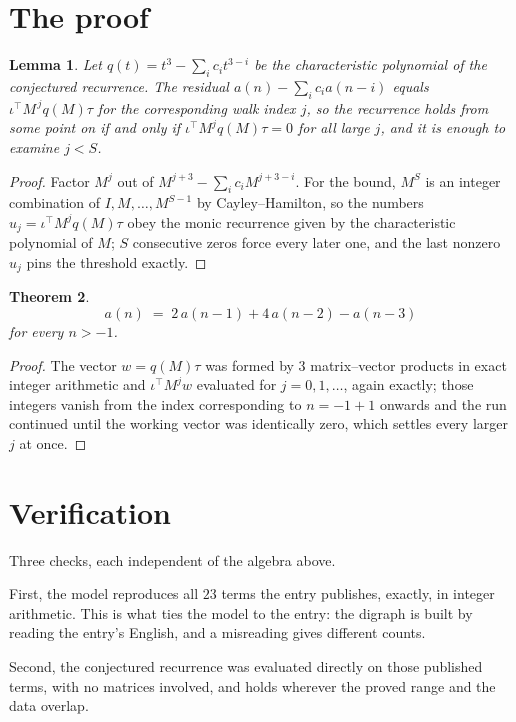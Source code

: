 \documentclass[11pt,a4paper]{article}
\theoremstyle{plain}
\newtheorem{theorem}{Theorem}
\newtheorem{lemma}[theorem]{Lemma}
\theoremstyle{definition}
\begin{document}
\section{The proof}

\begin{lemma}\label{lem:crit}
Let $q(t)=t^{3}-\sum_i c_it^{3-i}$ be the characteristic polynomial of the
conjectured recurrence. The residual $a(n)-\sum_ic_ia(n-i)$ equals
$\iota^{\!\top}M^{\,j}q(M)\tau$ for the corresponding walk index $j$, so the recurrence
holds from some point on if and only if $\iota^{\!\top}M^{j}q(M)\tau=0$ for all large $j$,
and it is enough to examine $j<S$.
\end{lemma}

\begin{proof}
Factor $M^{j}$ out of $M^{j+3}-\sum_ic_iM^{j+3-i}$. For the bound, $M^{S}$
is an integer combination of $I,M,\dots,M^{S-1}$ by Cayley--Hamilton, so the numbers
$u_j=\iota^{\!\top}M^{j}q(M)\tau$ obey the monic recurrence given by the characteristic
polynomial of $M$; $S$ consecutive zeros force every later one, and the last nonzero $u_j$
pins the threshold exactly.
\end{proof}

\begin{theorem}
\[
a(n)\;=\;2\,a(n-1) + 4\,a(n-2) - a(n-3)
\]
for every $n>-1$.
\end{theorem}

\begin{proof}
The vector $w=q(M)\tau$ was formed by $3$ matrix--vector products in exact integer
arithmetic and $\iota^{\!\top}M^{j}w$ evaluated for $j=0,1,\dots$, again exactly; those
integers vanish from the index corresponding to $n=-1+1$ onwards and the run continued
until the working vector was identically zero, which settles every larger $j$ at once.
\end{proof}

\section{Verification}

Three checks, each independent of the algebra above.

First, the model reproduces all $23$ terms the entry publishes, exactly, in integer
arithmetic. This is what ties the model to the entry: the digraph is built by reading the
entry's English, and a misreading gives different counts.

Second, the conjectured recurrence was evaluated directly on those published terms, with no
matrices involved, and holds wherever the proved range and the data overlap.
\end{document}
